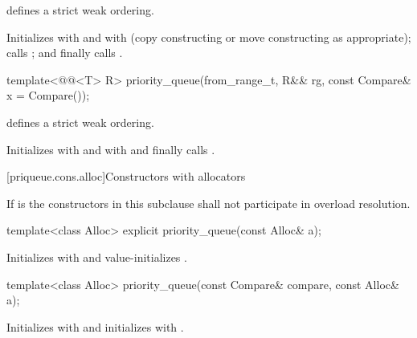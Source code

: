 \begin{itemdescr}
\pnum
\expects
{} defines a strict weak ordering.

\pnum
\effects
Initializes
 with
 and
 with
 (copy constructing or move constructing as appropriate);
calls
;
and finally calls
.
\end{itemdescr}

%
\begin{itemdecl}
template<@@<T> R>
  priority_queue(from_range_t, R&& rg, const Compare& x = Compare());
\end{itemdecl}

\begin{itemdescr}
\pnum
\expects
{} defines a strict weak ordering.

\pnum
\effects
Initializes  with  and
 with  and
finally calls .
\end{itemdescr}

[priqueue.cons.alloc]{Constructors with allocators}

\pnum
If  is 
the constructors in this subclause shall not participate in overload resolution.

%
\begin{itemdecl}
template<class Alloc> explicit priority_queue(const Alloc& a);
\end{itemdecl}

\begin{itemdescr}
\pnum
\effects
Initializes  with  and value-initializes .
\end{itemdescr}

%
\begin{itemdecl}
template<class Alloc> priority_queue(const Compare& compare, const Alloc& a);
\end{itemdecl}

\begin{itemdescr}
\pnum
\effects
Initializes  with  and initializes  with .
\end{itemdescr}

